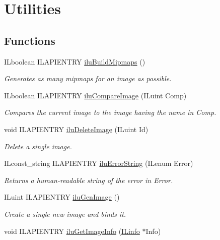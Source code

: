\hypertarget{group__ilu__util}{\section{Utilities}
\label{group__ilu__util}
}
\subsection*{Functions}
\begin{DoxyCompactItemize}
\item 
I\-Lboolean I\-L\-A\-P\-I\-E\-N\-T\-R\-Y \hyperlink{group__ilu__util_ga7a8bbd9d1eae3c620a937b6cde501d38}{ilu\-Build\-Mipmaps} ()
\begin{DoxyCompactList}\small\item\em Generates as many mipmaps for an image as possible. \end{DoxyCompactList}\item 
I\-Lboolean I\-L\-A\-P\-I\-E\-N\-T\-R\-Y \hyperlink{group__ilu__util_gab39876b316fc278f23c3a62bb085eb48}{ilu\-Compare\-Image} (I\-Luint Comp)
\begin{DoxyCompactList}\small\item\em Compares the current image to the image having the name in Comp. \end{DoxyCompactList}\item 
void I\-L\-A\-P\-I\-E\-N\-T\-R\-Y \hyperlink{group__ilu__util_gaf642c38dac816854d145940b5b0183ff}{ilu\-Delete\-Image} (I\-Luint Id)
\begin{DoxyCompactList}\small\item\em Delete a single image. \end{DoxyCompactList}\item 
I\-Lconst\-\_\-string I\-L\-A\-P\-I\-E\-N\-T\-R\-Y \hyperlink{group__ilu__util_gaa899a04791dfb88d8b48c823998af427}{ilu\-Error\-String} (I\-Lenum Error)
\begin{DoxyCompactList}\small\item\em Returns a human-\/readable string of the error in {\itshape Error}. \end{DoxyCompactList}\item 
I\-Luint I\-L\-A\-P\-I\-E\-N\-T\-R\-Y \hyperlink{group__ilu__util_gadd57b10666d393a87fc264b46bcb6134}{ilu\-Gen\-Image} ()
\begin{DoxyCompactList}\small\item\em Create a single new image and binds it. \end{DoxyCompactList}\item 
\hypertarget{group__ilu__util_ga2dba9fc87a5d05e1401cd5fa08cd5728}{void I\-L\-A\-P\-I\-E\-N\-T\-R\-Y \hyperlink{group__ilu__util_ga2dba9fc87a5d05e1401cd5fa08cd5728}{ilu\-Get\-Image\-Info} (\hyperlink{struct_i_l_uinfo}{I\-Linfo} $\ast$Info)}\label{group__ilu__util_ga2dba9fc87a5d05e1401cd5fa08cd5728}


\end{DoxyCompactItemize}
